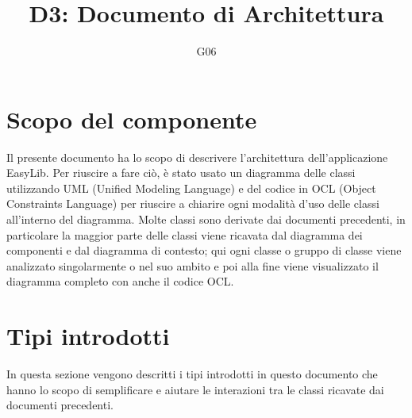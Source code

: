 \documentclass{article}
\title{D3: Documento di Architettura}
\author{G06}
\begin{document}
\maketitle

\tableofcontents
\newpage

\section{Scopo del componente}

Il presente documento ha lo scopo di descrivere l’architettura dell’applicazione EasyLib.
Per riuscire a fare ciò, è stato usato un diagramma delle classi utilizzando UML (Unified Modeling Language) e del codice in OCL (Object Constraints Language) per riuscire a chiarire ogni modalità d’uso delle classi all’interno del diagramma. Molte classi sono derivate dai documenti precedenti, in particolare la maggior parte delle classi viene ricavata dal diagramma dei componenti e dal diagramma di contesto; qui ogni classe o gruppo di classe viene analizzato singolarmente o nel suo ambito e poi alla fine viene visualizzato il diagramma completo con anche il codice OCL.

\section{Tipi introdotti}
In questa sezione vengono descritti i tipi introdotti in questo documento che hanno lo scopo di semplificare e aiutare le interazioni tra le classi ricavate dai documenti precedenti.
\end{document}
